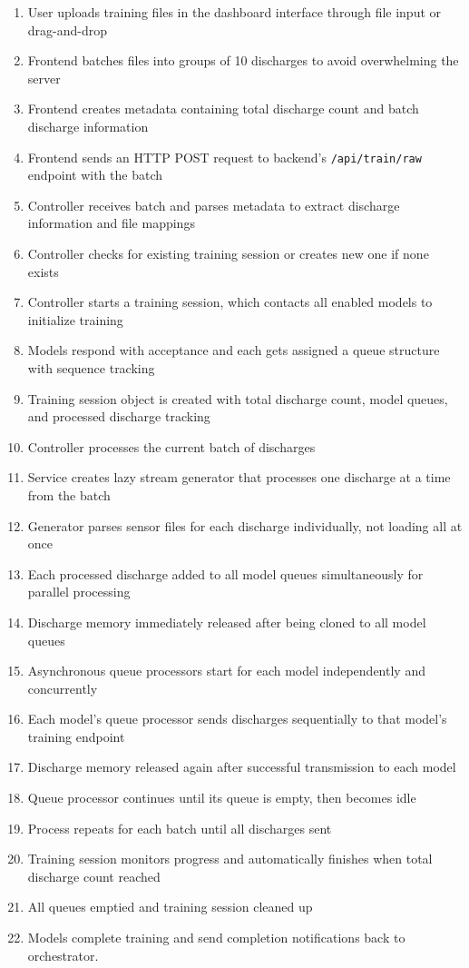 \begin{enumerate}
    \item User uploads training files in the dashboard interface through file input or drag-and-drop
    \item Frontend batches files into groups of 10 discharges to avoid overwhelming the server
    \item Frontend creates metadata containing total discharge count and batch discharge information
    \item Frontend sends an HTTP POST request to backend's \texttt{/api/train/raw} endpoint with the batch
    \item Controller receives batch and parses metadata to extract discharge information and file mappings
    \item Controller checks for existing training session or creates new one if none exists
    \item Controller starts a training session, which contacts all enabled models to initialize training
    \item Models respond with acceptance and each gets assigned a queue structure with sequence tracking
    \item Training session object is created with total discharge count, model queues, and processed discharge tracking
    \item Controller processes the current batch of discharges
    \item Service creates lazy stream generator that processes one discharge at a time from the batch
    \item Generator parses sensor files for each discharge individually, not loading all at once
    \item Each processed discharge added to all model queues simultaneously for parallel processing
    \item Discharge memory immediately released after being cloned to all model queues
    \item Asynchronous queue processors start for each model independently and concurrently
    \item Each model's queue processor sends discharges sequentially to that model's training endpoint
    \item Discharge memory released again after successful transmission to each model
    \item Queue processor continues until its queue is empty, then becomes idle
    \item Process repeats for each batch until all discharges sent
    \item Training session monitors progress and automatically finishes when total discharge count reached
    \item All queues emptied and training session cleaned up
    \item Models complete training and send completion notifications back to orchestrator.
\end{enumerate}


